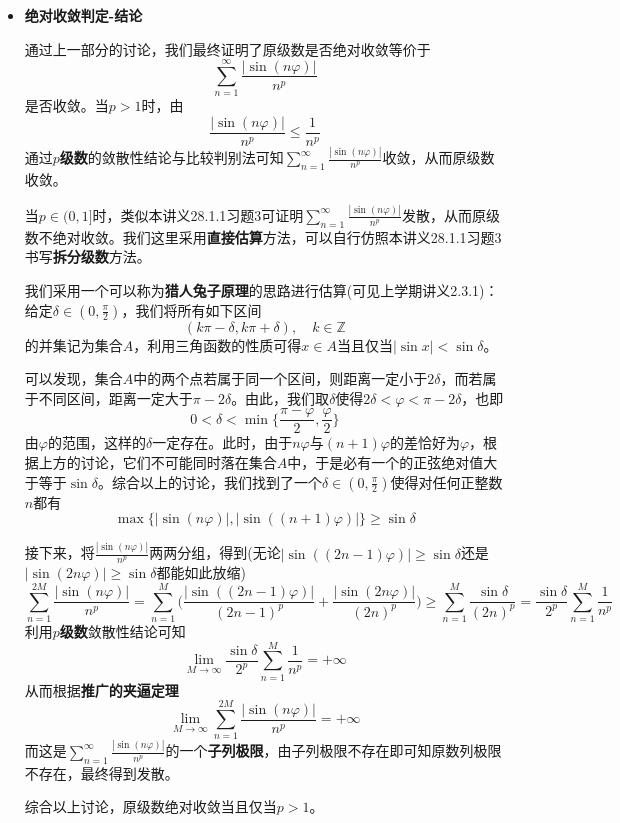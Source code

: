 \documentclass[a4paper,UTF8,fontset=windows,AutoFakeBold]{ctexart}
\newcommand*{\suminf}[1][n=1]{\sum_{#1}^\infty}
\theoremstyle{ex}
\begin{document}
\begin{framed}
{\begin{itemize}
        \item \textbf{绝对收敛判定-结论}
        
        通过上一部分的讨论，我们最终证明了原级数是否绝对收敛等价于
        $$\suminf\frac{|\sin(n\varphi)|}{n^p}$$
        是否收敛。当$p>1$时，由
        $$\frac{|\sin(n\varphi)|}{n^p}\le\frac{1}{n^p}$$
        通过\textbf{$p$级数}的敛散性结论与比较判别法可知$\suminf\frac{|\sin(n\varphi)|}{n^p}$收敛，从而原级数收敛。

        当$p\in(0,1]$时，类似本讲义28.1.1习题3可证明$\suminf\frac{|\sin(n\varphi)|}{n^p}$发散，从而原级数不绝对收敛。我们这里采用\textbf{直接估算}方法，可以自行仿照本讲义28.1.1习题3书写\textbf{拆分级数}方法。

        我们采用一个可以称为\textbf{猎人兔子原理}的思路进行估算(可见上学期讲义2.3.1)：给定$\delta\in(0,\frac{\pi}{2})$，我们将所有如下区间
        $$(k\pi-\delta,k\pi+\delta),\quad k\in\mathbb{Z}$$
        的并集记为集合$A$，利用三角函数的性质可得$x\in A$当且仅当$|\sin x|<\sin\delta$。

        可以发现，集合$A$中的两个点若属于同一个区间，则距离一定小于$2\delta$，而若属于不同区间，距离一定大于$\pi-2\delta$。由此，我们取$\delta$使得$2\delta<\varphi<\pi-2\delta$，也即
        $$0<\delta<\min\bigg\{\frac{\pi-\varphi}{2},\frac{\varphi}{2}\bigg\}$$
        由$\varphi$的范围，这样的$\delta$一定存在。此时，由于$n\varphi$与$(n+1)\varphi$的差恰好为$\varphi$，根据上方的讨论，它们不可能同时落在集合$A$中，于是必有一个的正弦绝对值大于等于$\sin\delta$。综合以上的讨论，我们找到了一个$\delta\in(0,\frac{\pi}{2})$使得对任何正整数$n$都有
        $$\max\{|\sin(n\varphi)|,|\sin((n+1)\varphi)|\}\ge\sin\delta$$

        接下来，将$\frac{|\sin(n\varphi)|}{n^p}$两两分组，得到(无论$|\sin((2n-1)\varphi)|\ge\sin\delta$还是$|\sin(2n\varphi)|\ge\sin\delta$都能如此放缩)
        $$\sum_{n=1}^{2M}\frac{|\sin(n\varphi)|}{n^p}=\sum_{n=1}^M\bigg(\frac{|\sin((2n-1)\varphi)|}{(2n-1)^p}+\frac{|\sin(2n\varphi)|}{(2n)^p}\bigg)\ge\sum_{n=1}^M\frac{\sin\delta}{(2n)^p}=\frac{\sin\delta}{2^p}\sum_{n=1}^M\frac{1}{n^p}$$
        利用\textbf{$p$级数}敛散性结论可知
        $$\lim_{M\to\infty}\frac{\sin\delta}{2^p}\sum_{n=1}^M\frac{1}{n^p}=+\infty$$
        从而根据\textbf{推广的夹逼定理}
        $$\lim_{M\to\infty}\sum_{n=1}^{2M}\frac{|\sin(n\varphi)|}{n^p}=+\infty$$
        而这是$\suminf\frac{|\sin(n\varphi)|}{n^p}$的一个\textbf{子列极限}，由子列极限不存在即可知原数列极限不存在，最终得到发散。

        综合以上讨论，原级数绝对收敛当且仅当$p>1$。


\end{itemize}}
\end{framed}
\end{document}
